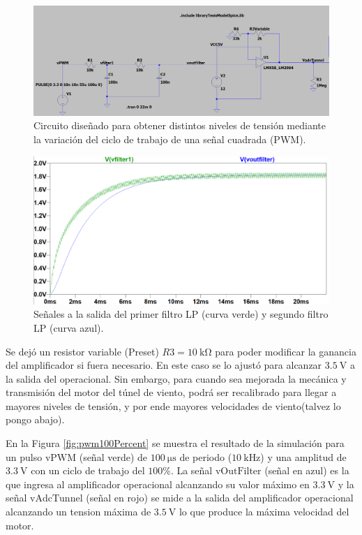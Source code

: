 \begin{figure}[H]
    \centering
    \includegraphics[width=1\linewidth]{Figuras/datalogger/Hardware/pwmCircuitSimulate.png}
    \caption{Circuito diseñado para obtener distintos niveles de tensión mediante la variación del ciclo de trabajo de una señal cuadrada (PWM).}
    \label{fig:pwmCircuitSimulate}
\end{figure}

\begin{figure}[H]
    \centering
    \includegraphics[width=1\linewidth]{Figuras/datalogger/Hardware/filter1and2.png}
    \caption{Señales a la salida del primer filtro LP (curva verde) y segundo filtro LP (curva azul).}
    \label{fig:filter1and2}
\end{figure}

Se dejó un resistor variable (Preset) $R3=\SI{10}{\kilo\ohm}$ para poder modificar la ganancia del amplificador si fuera necesario. En este caso se lo ajustó para alcanzar $\SI{3.5}{\volt}$ a la salida del operacional. Sin embargo, para cuando sea mejorada la mecánica y transmisión del motor del túnel de viento, podrá ser recalibrado para llegar a mayores niveles de tensión, y por ende mayores velocidades de viento(talvez lo pongo abajo).

En la Figura \ref{fig:pwm100Percent} se muestra el resultado de la simulación para un pulso $\text{vPWM}$ (señal verde) de $\SI{100}{\micro\second}$ de periodo ($\SI{10}{\kilo\hertz}$) y una amplitud de $\SI{3.3}{\volt}$ con un ciclo de trabajo del $100\%$. La señal $\text{vOutFilter}$ (señal en azul) es la que ingresa al amplificador operacional alcanzando su valor máximo en $\SI{3.3}{\volt}$ y la señal $\text{vAdcTunnel}$ (señal en rojo) se mide a la salida del amplificador operacional alcanzando un tension máxima de $\SI{3.5}{\volt}$ lo que produce la máxima velocidad del motor.

